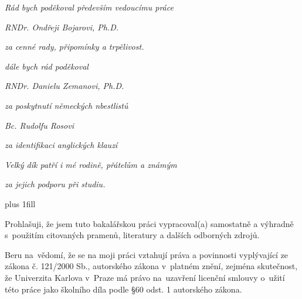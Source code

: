 \documentclass[12pt,a4paper]{report}
\let\openright=\clearpage
\begin{document}
\newpage



\openright

\noindent
\begin{center}

\vspace{50mm}

\textit{
Rád bych poděkoval především vedoucímu práce}
\vspace{5mm}

\textit{RNDr. Ondřeji Bojarovi, Ph.D.}

\textit{za cenné rady, připomínky a trpělivost.}

\vspace{30mm}



\textit{dále bych rád poděkoval}

\vspace{10mm}

\textit{RNDr. Danielu Zemanovi, Ph.D.}

\textit{za poskytnutí německých nbestlistů}

\vspace{10mm}

\textit{Bc. Rudolfu Rosovi}

\textit{za identifikaci anglických klauzí}



\vspace{30mm}

\textit{
Velký dík patří i mé rodině, přátelům a známým }

\textit{
za jejich podporu při studiu.
}

\end{center}

\newpage


\vglue 0pt plus 1fill

\noindent
Prohlašuji, že jsem tuto bakalářskou práci vypracoval(a) samostatně a výhradně
s~použitím citovaných pramenů, literatury a dalších odborných zdrojů.

\medskip\noindent
Beru na~vědomí, že se na moji práci vztahují práva a povinnosti vyplývající
ze zákona č. 121/2000 Sb., autorského zákona v~platném znění, zejména skutečnost,
že Univerzita Karlova v~Praze má právo na~uzavření licenční smlouvy o~užití této
práce jako školního díla podle §60 odst. 1 autorského zákona.
\end{document}

